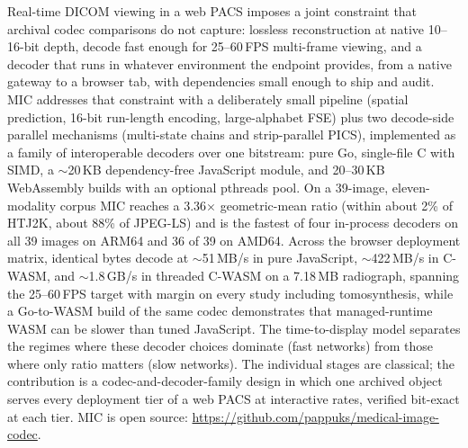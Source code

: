 \documentclass[journal]{IEEEtran}
\begin{document}
Real-time DICOM viewing in a web PACS imposes a joint constraint that
archival codec comparisons do not capture: lossless reconstruction at native
10--16-bit depth, decode fast enough for 25--60\,FPS multi-frame viewing,
and a decoder that runs in whatever environment the endpoint provides, from
a native gateway to a browser tab, with dependencies small enough to ship
and audit. MIC addresses that constraint with a deliberately small pipeline
(spatial prediction, 16-bit run-length encoding, large-alphabet FSE) plus
two decode-side parallel mechanisms (multi-state chains and strip-parallel
PICS), implemented as a family of interoperable decoders over one bitstream:
pure Go, single-file C with SIMD, a ${\sim}$20\,KB dependency-free
JavaScript module, and 20--30\,KB WebAssembly builds with an optional
pthreads pool. On a 39-image, eleven-modality corpus MIC reaches a
3.36$\times$ geometric-mean ratio (within about 2\% of HTJ2K, about 88\% of
JPEG-LS) and is the fastest of four in-process decoders on all 39 images on
ARM64 and 36 of 39 on AMD64. Across the browser deployment matrix, identical
bytes decode at ${\sim}$51\,MB/s in pure JavaScript, ${\sim}$422\,MB/s in
C-WASM, and ${\sim}$1.8\,GB/s in threaded C-WASM on a 7.18\,MB radiograph,
spanning the 25--60\,FPS target with margin on every study including
tomosynthesis, while a Go-to-WASM build of the same codec demonstrates that
managed-runtime WASM can be slower than tuned JavaScript. The
time-to-display model separates the regimes where these decoder choices
dominate (fast networks) from those where only ratio matters (slow
networks). The individual stages are classical; the contribution is a
codec-and-decoder-family design in which one archived object serves every
deployment tier of a web PACS at interactive rates, verified bit-exact at
each tier. MIC is open source:
\url{https://github.com/pappuks/medical-image-codec}.
\end{document}
